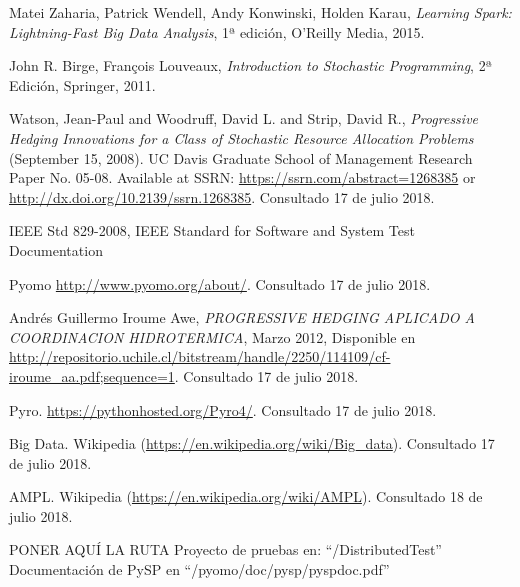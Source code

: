 

\begin{thebibliography}{99}
% 
% 
% 

 Matei Zaharia, Patrick Wendell, Andy Konwinski, Holden Karau, {\it Learning Spark: Lightning-Fast Big Data Analysis}, 1ª edición, O'Reilly Media, 2015.

 John R. Birge, François Louveaux, {\it Introduction to Stochastic Programming}, 2ª Edición, Springer, 2011.

  Watson, Jean-Paul and Woodruff, David L. and Strip, David R., {\it Progressive Hedging Innovations for a Class of Stochastic Resource Allocation Problems} (September 15, 2008). UC Davis Graduate School of Management Research Paper No. 05-08. Available at SSRN: \url{https://ssrn.com/abstract=1268385} or \url{http://dx.doi.org/10.2139/ssrn.1268385}. Consultado 17 de julio 2018.

 IEEE Std 829-2008, IEEE Standard for Software and System Test Documentation

 Pyomo \url{http://www.pyomo.org/about/}. Consultado 17 de julio 2018.

 Andrés Guillermo Iroume Awe, {\it PROGRESSIVE  HEDGING APLICADO A COORDINACION HIDROTERMICA}, Marzo 2012, Disponible en \url{http://repositorio.uchile.cl/bitstream/handle/2250/114109/cf-iroume_aa.pdf;sequence=1}. Consultado 17 de julio 2018.

 Pyro. \url{https://pythonhosted.org/Pyro4/}. Consultado 17 de julio 2018.

 Big Data. Wikipedia (\url{https://en.wikipedia.org/wiki/Big\_data}). Consultado 17 de julio 2018.

 AMPL. Wikipedia (\url{https://en.wikipedia.org/wiki/AMPL}). Consultado 18 de julio 2018.


 PONER AQUÍ LA RUTA
 Proyecto de pruebas en: ``/DistributedTest''
 Documentación de PySP en ``/pyomo/doc/pysp/pyspdoc.pdf''

\end{thebibliography}

